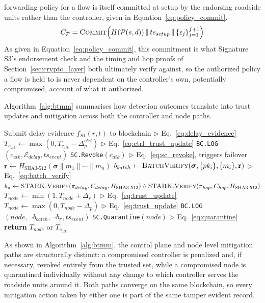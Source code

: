 \documentclass[final,5p,twocolumn]{elsarticle}
\renewcommand{\Comment}[1]{\hfill$\triangleright$ #1}
\theoremstyle{remark}
\theoremstyle{plain}
\begin{document}
forwarding policy for a flow is itself committed at setup by the endorsing
roadside units rather than the controller, given in
Equation~\eqref{eq:policy_commit}.
\begin{equation}
	C_{\mathcal{P}} = \textsc{Commit}\!\left(H(\mathcal{P}(s,d)) \,\|\, ts_{setup} \,\|\, \{\epsilon_j\}_{j=1}^{f+1}\right)
	\label{eq:policy_commit}
\end{equation}
As given in Equation~\eqref{eq:policy_commit}, this commitment is what
Signature S3's endorsement check and the timing and hop proofs of
Section~\ref{sec:crypto_layer} both ultimately verify against, so the
authorized policy a flow is held to is never dependent on the controller's
own, potentially compromised, account of what it authorized.

Algorithm~\ref{alg:btmm} summarises how detection outcomes translate into
trust updates and mitigation across both the controller and node paths.
\begin{algorithm}[!t]
	\caption{Blockchain Trust Management and Mitigation (BTMM)}
	\label{alg:btmm}
	\begin{algorithmic}[1]
		\small
		\State Submit delay evidence $f_{S1}(r,t)$ to blockchain \Comment{Eq.~\eqref{eq:delay_evidence}}
		\State $T_{c_{atk}} \gets \max(0, T_{c_{atk}} - \Delta_p^{ctrl})$ \Comment{Eq.~\eqref{eq:ctrl_trust_update}}
		\State \texttt{BC.LOG}$(c_{atk}, \mathcal{E}_{delay}, ts_{event})$
		\State \texttt{SC.Revoke}$(c_{atk})$ \Comment{Eq.~\eqref{eq:sc_revoke}, triggers failover}
		\EndIf
		\EndIf
		\Else
		\State $\mathbf{r} \gets H_{\text{SHA3-512}}(\boldsymbol{\sigma}\|m_1\|\cdots\|m_n)$
		\State $b_{batch} \gets \textsc{BatchVerify}(\boldsymbol{\sigma}, \{pk_i\}, \{m_i\}, \mathbf{r})$ \Comment{Eq.~\eqref{eq:batch_verify}}
		\State $b_{\pi} \gets \textsc{STARK.Verify}(\pi_{delay}, C_{delay}, H_{\text{SHA3-512}}) \land \textsc{STARK.Verify}(\pi_{hop}, C_{hop}, H_{\text{SHA3-512}})$
		\State $T_{node} \gets \min(1, T_{node} + \Delta_r)$ \Comment{Eq.~\eqref{eq:trust_update}}
		\Else
		\State $T_{node} \gets \max(0, T_{node} - \Delta_p)$ \Comment{Eq.~\eqref{eq:trust_update}}
		\State \texttt{BC.LOG}$(node, \neg b_{batch}, \neg b_{\pi}, ts_{event})$
		\EndIf
		\State \texttt{SC.Quarantine}$(node)$ \Comment{Eq.~\eqref{eq:quarantine}}
		\EndIf
		\EndIf
		\State \textbf{return} $T_{node}$ or $T_{c_{atk}}$
		\EndProcedure
	\end{algorithmic}
\end{algorithm}
As shown in Algorithm~\ref{alg:btmm}, the control plane and node level
mitigation paths are structurally distinct: a compromised controller is
penalized and, if necessary, revoked entirely from the trusted set, while a
compromised node is quarantined individually without any change to which
controller serves the roadside units around it. Both paths converge on the
same blockchain, so every mitigation action taken by either one is part of
the same tamper evident record.
\end{document}
